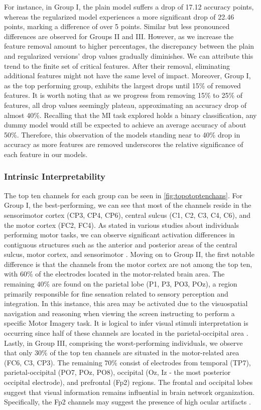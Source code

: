 For instance, in Group I, the plain model suffers a drop of 17.12 accuracy points, whereas the regularized model experiences a more significant drop of 22.46 points, marking a difference of over 5 points. Similar but less pronounced differences are observed for Groups II and III. However, as we increase the feature removal amount to higher percentages, the discrepancy between the plain and regularized versions' drop values gradually diminishes. We can attribute this trend to the finite set of critical features. After their removal, eliminating additional features might not have the same level of impact. Moreover, Group I, as the top performing group, exhibits the largest drops until 15\% of removed features. It is worth noting that as we progress from removing 15\% to 25\% of features, all drop values seemingly plateau, approximating an accuracy drop of almost 40\%. Recalling that the MI task explored holds a binary classification, any dummy model would still be expected to achieve an average accuracy of about 50\%. Therefore, this observation of the models standing near to 40\% drop in accuracy as more features are removed underscores the relative significance of each feature in our models.


\subsubsection{Intrinsic Interpretability}

The top ten channels for each group can be seen in \cref{fig:topotoptenchans}. For Group I, the best-performing, we can see that most of the channels reside in the sensorimotor cortex (CP3, CP4, CP6), central sulcus (C1, C2, C3, C4, C6), and the motor cortex (FC2, FC4). As stated in various studies about individuals performing motor tasks, we can observe significant activation differences in contiguous structures such as the anterior and posterior areas of the central sulcus, motor cortex, and sensorimotor \cite{eichert2021morphological}. Moving on to Group II, the first notable difference is that the channels from the motor cortex are not among the top ten, with $60\%$ of the electrodes located in the motor-related brain area. The remaining $40\%$ are found on the parietal lobe (P1, P3, PO3, POz), a region primarily responsible for fine sensation related to sensory perception and integration. In this instance, this area may be activated due to the visuospatial navigation and reasoning when viewing the screen instructing to perform a specific Motor Imagery task. It is logical to infer visual stimuli interpretation is occurring since half of these channels are located in the parietal-occipital area \cite{phunruangsakao2023effects}. Lastly, in Group III, comprising the worst-performing individuals, we observe that only $30\%$ of the top ten channels are situated in the motor-related area (FC6, C3, CP3). The remaining $70\%$ consist of electrodes from temporal (TP7), parietal-occipital (PO7, POz, PO8), occipital (Oz, Iz - the most posterior occipital electrode), and prefrontal (Fp2) regions. The frontal and occipital lobes suggest that visual information remains influential in brain network organization. Specifically, the Fp2 channels may suggest the presence of high ocular artifacts \cite{han2023cepstral}.

